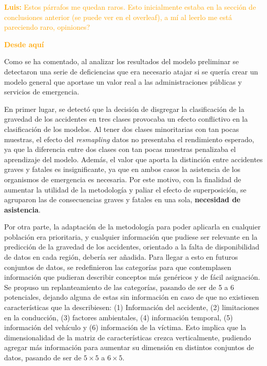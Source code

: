 \textcolor{orange}{\textbf{Luis:} Estos párrafos me quedan raros. Esto inicialmente estaba en la sección de conclusiones anterior (se puede ver en el overleaf), a mí al leerlo me está pareciendo raro, opiniones?}

\textcolor{orange}{\textbf{Desde aquí}}

Como se ha comentado, al analizar los resultados del modelo preliminar se detectaron una serie de deficiencias que era necesario atajar si se quería crear un modelo general que aportase un valor real a las administraciones públicas y servicios de emergencia.

En primer lugar, se detectó que la decisión de disgregar la clasificación de la gravedad de los accidentes en tres clases provocaba un efecto conflictivo en la clasificación de los modelos. Al tener dos clases minoritarias con tan pocas muestras, el efecto del \textit{resmapling} datos no presentaba el rendimiento esperado, ya que la diferencia entre dos clases con tan pocas muestras penalizaba el aprendizaje del modelo. Además, el valor que aporta la distinción entre accidentes graves y fatales es insignificante, ya que en ambos casos la asistencia de los organismos de emergencia es necesaria. Por este motivo, con la finalidad de aumentar la utilidad de la metodología y paliar el efecto de superposición, se agruparon las de consecuencias graves y fatales en una sola, \textbf{necesidad de asistencia}.




Por otra parte, la adaptación de la metodología para poder aplicarla en cualquier población era prioritaria, y cualquier información que pudiese ser relevante en la predicción de la gravedad de los accidentes, orientado a la falta de disponibilidad de datos en cada región, debería ser añadida. Para llegar a esto en futuros conjuntos de datos, se redefinieron las categorías para que contemplasen información que pudieran describir conceptos más genéricos y de fácil asignación. Se propuso un replanteamiento de las categorías, pasando de ser de 5 a 6 potenciales, dejando alguna de estas sin información en caso de que no existiesen características que la describiesen: (1) Información del accidente, (2) limitaciones en la conducción, (3) factores ambientales, (4) información temporal, (5) información del vehículo y (6) información de la víctima. Esto implica que la dimensionalidad de la matriz de características crezca verticalmente, pudiendo agregar más información para aumentar su dimensión en distintos conjuntos de datos, pasando de ser de $5 \times 5$ a $6 \times 5$.

